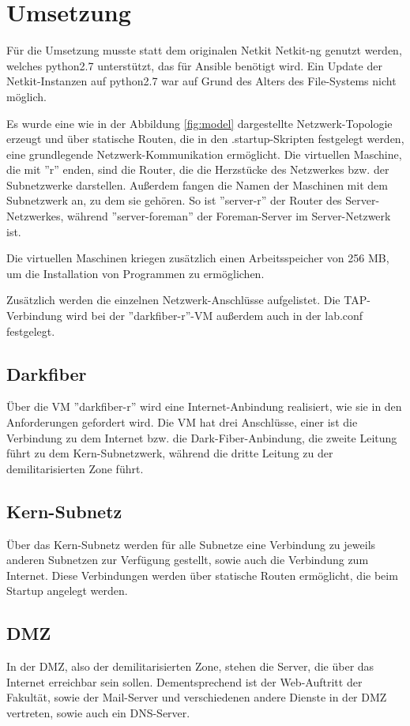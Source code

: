\chapter{Umsetzung}

Für die Umsetzung musste statt dem originalen Netkit Netkit-ng genutzt werden, welches python2.7 unterstützt, das für Ansible benötigt wird. Ein Update der Netkit-Instanzen auf python2.7 war auf Grund des Alters des File-Systems nicht möglich.

Es wurde eine wie in der Abbildung \ref{fig:model} dargestellte Netzwerk-Topologie erzeugt und über statische Routen, die in den .startup-Skripten festgelegt werden, eine grundlegende Netzwerk-Kommunikation ermöglicht. 
Die virtuellen Maschine, die mit ''r'' enden, sind die Router, die die Herzstücke des Netzwerkes bzw. der Subnetzwerke darstellen. 
Außerdem fangen die Namen der Maschinen mit dem Subnetzwerk an, zu dem sie gehören. 
So ist ''server-r'' der Router des Server-Netzwerkes, während ''server-foreman'' der Foreman-Server im Server-Netzwerk ist.

Die virtuellen Maschinen kriegen zusätzlich einen Arbeitsspeicher von 256 MB, um die Installation von Programmen zu ermöglichen.

Zusätzlich werden die einzelnen Netzwerk-Anschlüsse aufgelistet. Die TAP-Verbindung wird bei der ''darkfiber-r''-VM außerdem auch in der lab.conf festgelegt.

\section{Darkfiber}
Über die VM ''darkfiber-r'' wird eine Internet-Anbindung realisiert, wie sie in den Anforderungen gefordert wird. Die VM hat drei Anschlüsse, einer ist die Verbindung zu dem Internet bzw. die Dark-Fiber-Anbindung, die zweite Leitung führt zu dem Kern-Subnetzwerk, während die dritte Leitung zu der demilitarisierten Zone führt.

\section{Kern-Subnetz}
Über das Kern-Subnetz werden für alle Subnetze eine Verbindung zu jeweils anderen Subnetzen zur Verfügung gestellt, sowie auch die Verbindung zum Internet. Diese Verbindungen werden über statische Routen ermöglicht, die beim Startup angelegt werden.

\section{DMZ}
In der DMZ, also der demilitarisierten Zone, stehen die Server, die über das Internet erreichbar sein sollen. Dementsprechend ist der Web-Auftritt der Fakultät, sowie der Mail-Server und verschiedenen andere Dienste in der DMZ vertreten, sowie auch ein DNS-Server.

